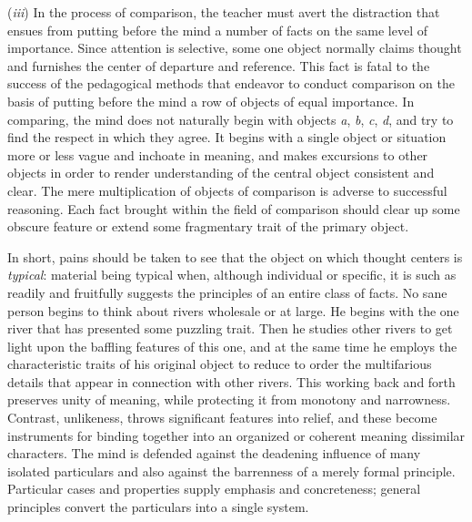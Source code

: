\documentclass[letterpaper]{book}
\begin{document}

(\emph{iii}) In the process of comparison, the teacher must avert the
distraction that ensues from putting before the mind a number of facts
on the same level of importance. Since attention is selective, some one
object normally claims thought and furnishes the center of departure and
reference. This fact is fatal to the success of the pedagogical methods
that endeavor to conduct comparison on the basis of putting before the
mind a row of objects of equal importance. In comparing, the mind does
not naturally begin with objects \emph{a}, \emph{b}, \emph{c}, \emph{d},
and try to find the respect in which they agree. It begins with a single
object or situation more or less vague and inchoate in meaning, and
makes excursions to other objects in order to render understanding of
the central object consistent and clear. The mere multiplication of
objects of comparison is adverse to successful reasoning. Each fact
brought within the field of comparison should clear up some obscure
feature or extend some fragmentary trait of the primary object.


In short, pains should be taken to see that the object on which thought
centers is \emph{typical}: material being typical when, although
individual or specific, it is such as readily and fruitfully suggests
the principles of an
entire
class of facts. No sane person begins to think about rivers wholesale or
at large. He begins with the one river that has presented some puzzling
trait. Then he studies other rivers to get light upon the baffling
features of this one, and at the same time he employs the characteristic
traits of his original object to reduce to order the multifarious
details that appear in connection with other rivers. This working back
and forth preserves unity of meaning, while protecting it from monotony
and narrowness. Contrast, unlikeness, throws significant features into
relief, and these become instruments for binding together into an
organized or coherent meaning dissimilar characters. The mind is
defended against the deadening influence of many isolated particulars
and also against the barrenness of a merely formal principle. Particular
cases and properties supply emphasis and concreteness; general
principles convert the particulars into a single system.

\end{document}
